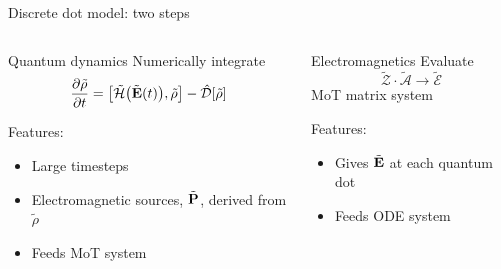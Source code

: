 \documentclass[aspectratio=169, usenames, dvipsnames]{beamer}
\begin{document}
\begin{frame}{Discrete dot model: two steps}
  \begin{columns}
    \begin{column}{0.5\textwidth}
      \begin{block}{Quantum dynamics}
        Numerically integrate
        \begin{equation*}
          \pdv{\tilde{\rho}}{t} = \commutator{\tilde{\mathcal{H}}\qty\big(\tilde{\vb{E}}(t))}{\tilde{\rho}} - \hat{\mathcal{D}}\qty[\tilde{\rho}]
        \end{equation*}

        Features:
        \begin{itemize}
          \item Large timesteps
          \item Electromagnetic sources, $\tilde{\vb{P}}$, derived from $\tilde{\rho}$
          \item Feeds MoT system
        \end{itemize}
      \end{block}
    \end{column}

    \begin{column}{0.5\textwidth}
      \begin{block}{Electromagnetics}
        Evaluate 
        \begin{equation*}
          \tilde{\mathcal{Z}} \cdot  \tilde{\mathcal{A}} \to \tilde{\mathcal{E}}
        \end{equation*}
        MoT matrix system

        Features:
        \begin{itemize}
          \item Gives $\tilde{\vb{E}}$ at each quantum dot
          \item Feeds ODE system
        \end{itemize}
      \end{block}
    \end{column}
  \end{columns}
\end{frame}
\end{document}
